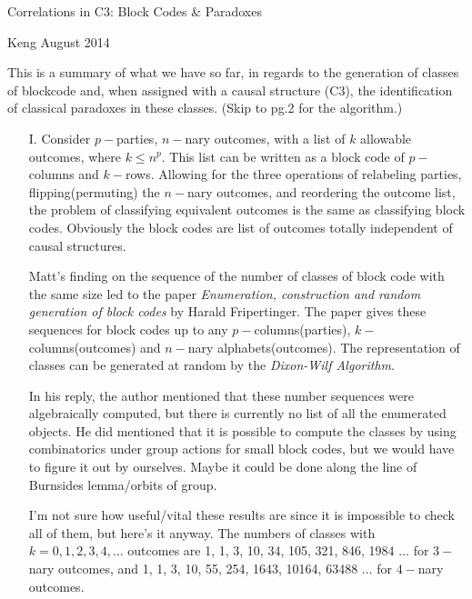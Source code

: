\documentclass[12pt]{article}  %
\begin{document}
{\Large \centerline{Correlations in C3: Block Codes \& Paradoxes}}

{\centerline {Keng \quad August 2014}}


This is a summary of what we have so far, in regards to the generation of classes of blockcode and, when assigned with a causal structure (C3), the identification of classical paradoxes in these classes. (Skip to pg.2 for the algorithm.)




\begin{enumerate}

\item[I.] Consider $p-$parties, $n-$nary outcomes, with a list of $k$ allowable outcomes, where $k \leq n^p$. This list can be written as a block code of $p-$columns and $k-$rows. Allowing for the three operations of relabeling parties, flipping(permuting) the $n-$nary outcomes, and reordering the outcome list, the problem of classifying equivalent outcomes is the same as classifying block codes. Obviously the block codes are list of outcomes totally independent of causal structures.

Matt's finding on the sequence of the number of classes of block code with the same size led to the paper \textit{Enumeration, construction and random generation of block codes} by Harald Fripertinger. The paper gives these sequences for block codes up to any $p-$columns(parties), $k-$columns(outcomes) and $n-$nary alphabets(outcomes). The representation of classes can be generated at random by the \textit{Dixon-Wilf Algorithm}.

In his reply, the author mentioned that these number sequences were algebraically computed, but there is currently no list of all the enumerated objects. He did mentioned that it is possible to compute the classes by using combinatorics under group actions for small block codes, but we would have to figure it out by ourselves. Maybe it could be done along the line of Burnsides lemma/orbits of group.

I'm not sure how useful/vital these results are since it is impossible to check all of them, but here's it anyway. The numbers of classes with $k = 0, 1, 2, 3, 4, \dots$ outcomes are 1, 1, 3, 10, 34, 105, 321, 846, 1984 $\dots$ for $3-$nary outcomes, and 1, 1, 3, 10, 55, 254, 1643, 10164, 63488 $\dots$ for $4-$nary outcomes.


\end{enumerate}
\end{document}
